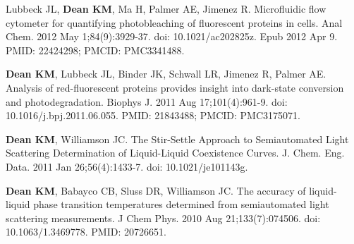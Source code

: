 \begin{etaremune}
\item Lubbeck JL, \textbf{Dean KM}, Ma H, Palmer AE, Jimenez R. Microfluidic flow cytometer for quantifying photobleaching of fluorescent proteins in cells. Anal Chem. 2012 May 1;84(9):3929-37. doi: 10.1021/ac202825z. Epub 2012 Apr 9. PMID: 22424298; PMCID: PMC3341488.

\item \textbf{Dean KM}, Lubbeck JL, Binder JK, Schwall LR, Jimenez R, Palmer AE. Analysis of red-fluorescent proteins provides insight into dark-state conversion and photodegradation. Biophys J. 2011 Aug 17;101(4):961-9. doi: 10.1016/j.bpj.2011.06.055. PMID: 21843488; PMCID: PMC3175071.

\item \textbf{Dean KM}, Williamson JC. The Stir-Settle Approach to Semiautomated Light Scattering Determination of Liquid-Liquid Coexistence Curves.  J. Chem. Eng. Data.  2011 Jan 26;56(4):1433-7. doi: 10.1021/je101143g.

\item \textbf{Dean KM}, Babayco CB, Sluss DR, Williamson JC. The accuracy of liquid-liquid phase transition temperatures determined from semiautomated light scattering measurements. J Chem Phys. 2010 Aug 21;133(7):074506. doi: 10.1063/1.3469778. PMID: 20726651.

\end{etaremune}
